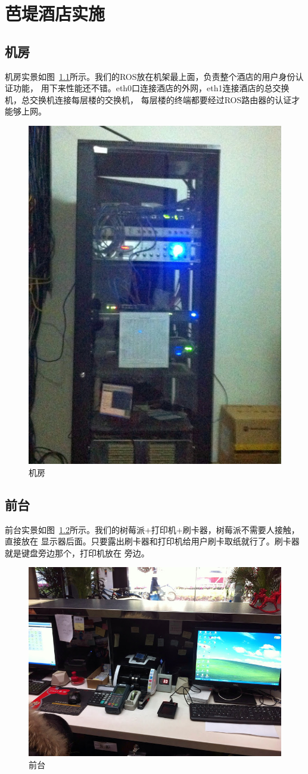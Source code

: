 \chapter{芭堤酒店实施}

\section{机房}

机房实景如图~\ref{fig:back}所示。我们的ROS放在机架最上面，负责整个酒店的用户身份认证功能，
用下来性能还不错。eth0口连接酒店的外网，eth1连接酒店的总交换机，总交换机连接每层楼的交换机，
每层楼的终端都要经过ROS路由器的认证才能够上网。

\begin{figure}[h]
  \centering
    \includegraphics[width=.5\textwidth]{pic/back}
  \caption{机房}
  \label{fig:back}
\end{figure}

\section{前台}

前台实景如图~\ref{fig:front}所示。我们的树莓派+打印机+刷卡器，树莓派不需要人接触，直接放在
显示器后面。只要露出刷卡器和打印机给用户刷卡取纸就行了。刷卡器就是键盘旁边那个，打印机放在
旁边。
\begin{figure}[h]
  \centering
    \includegraphics[width=.7\textwidth]{pic/front}
  \caption{前台}
  \label{fig:front}
\end{figure}

